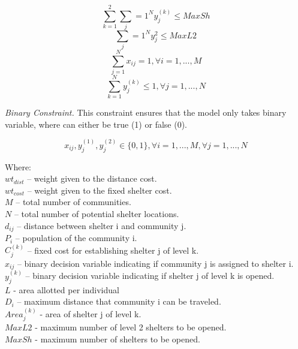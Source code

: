 \documentclass[11pt,letterpaper,]{article}
\begin{document}
	\begin{equation} 
		\label{c3}
		\sum_{k=1}^{2} \sum_j={1}^{N}y_{j}^{(k)} \le MaxSh
	\end{equation}
	\begin{equation}
		\label{c4} 
		\sum_j={1}^{N}y_{j}^2 \le MaxL2
	\end{equation}
	\begin{equation}
		\label{c5}
		\sum_{j=1}^{N}x_{ij} = 1, \forall i=1,...,M
	\end{equation}
	\begin{equation}
		\label{c6}
		\sum_{k=1}^{N}y_{j}^{(k)} \le 1, \forall j=1,...,N
	\end{equation}
	
	\textit{Binary Constraint.} This constraint ensures that the model only takes binary variable, where can either be true (1) or false (0).
	
	\begin{equation}
		\label{c7}
		x_{ij}, y_{j}^{(1)},y_{j}^{(2)} \in \{0,1\}, \forall i=1,...,M,  \forall j=1,...,N
	\end{equation}
	
	\noindent Where:
	\\$wt_{dist}$ – weight given to the distance cost.
	\\$wt_{cost}$ – weight given to the fixed shelter cost.
	\\$M$ – total number of communities.
	\\$N$ – total number of potential shelter locations.
	\\$d_{ij}$ – distance between shelter i and community j.
	\\$P_{i}$ – population of the community i.
	\\$C_{j}^{(k)}$ – fixed cost for establishing shelter j of level k.
	\\$x_{ij}$ – binary decision variable indicating if community j is assigned to shelter i.
	\\$y_{j}^{(k)}$ – binary decision variable indicating if shelter j of level k is opened.
	\\$L$ - area allotted per individual
	\\$D_{i}$ – maximum distance that community i can be traveled.
	\\$Area_{j}^{(k)}$ - area of shelter j of level k.
	\\$MaxL2$ - maximum number of level 2 shelters to be opened.
	\\$MaxSh$ - maximum number of shelters to be opened.
	\\
	
\end{document}
